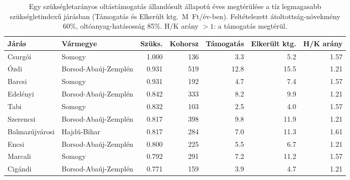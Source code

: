 \begin{table}[htbp]
\centering
\small
\caption{Egy szükségletarányos oltástámogatás állandósult állapotú éves megtérülése a tíz legmagasabb szükségletindexű járásban (Támogatás és Elkerült ktg.\ M~Ft/év-ben). Feltételezett átoltottság-növekmény 60\%, oltóanyag-hatásosság 85\%. H/K arány $>1$: a támogatás megtérül.}
\label{tab:costeff}
\begin{tabular}{llrrrrr}
\toprule
Járás & Vármegye & Szüks. & Kohorsz & Támogatás & Elkerült ktg. & H/K arány \\
\midrule
Csurgói & Somogy & 1.000 & 136 & 3.3 & 5.2 & 1.57 \\
Ózdi & Borsod-Abaúj-Zemplén & 0.931 & 519 & 12.8 & 15.5 & 1.21 \\
Barcsi & Somogy & 0.931 & 192 & 4.7 & 7.4 & 1.57 \\
Edelényi & Borsod-Abaúj-Zemplén & 0.842 & 333 & 8.2 & 9.9 & 1.21 \\
Tabi & Somogy & 0.832 & 103 & 2.5 & 4.0 & 1.57 \\
Szerencsi & Borsod-Abaúj-Zemplén & 0.817 & 398 & 9.8 & 11.9 & 1.21 \\
Balmazújvárosi & Hajdú-Bihar & 0.817 & 284 & 7.0 & 11.3 & 1.61 \\
Encsi & Borsod-Abaúj-Zemplén & 0.800 & 225 & 5.5 & 6.7 & 1.21 \\
Marcali & Somogy & 0.792 & 291 & 7.2 & 11.2 & 1.57 \\
Cigándi & Borsod-Abaúj-Zemplén & 0.771 & 159 & 3.9 & 4.7 & 1.21 \\
\bottomrule
\end{tabular}
\end{table}
